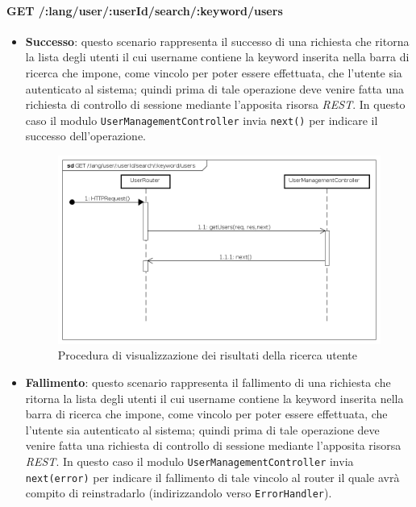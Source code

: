 \paragraph{GET /:lang/user/:userId/search/:keyword/users}
\begin{itemize}
\item \textbf{Successo}: questo scenario rappresenta il successo di una richiesta che ritorna la lista degli utenti il cui username contiene la keyword inserita nella barra di ricerca che impone, come vincolo per poter essere effettuata, che l'utente sia autenticato al sistema; quindi prima di tale operazione deve venire fatta una richiesta di controllo di sessione mediante l'apposita risorsa \textit{REST}. In questo caso il modulo \texttt{UserManagementController} invia \texttt{next()} per indicare il successo dell'operazione.

\begin{figure}[ht]
	\centering
	\includegraphics[scale=0.45]{UML/DiagrammiDiSequenza/Back-end/GET__lang_user__userId_search__keyword_users_success.png}
	\caption{Procedura di visualizzazione dei risultati della ricerca utente}
\end{figure}
\FloatBarrier

\item \textbf{Fallimento}: questo scenario rappresenta il fallimento di una richiesta che ritorna la lista degli utenti il cui username contiene la keyword inserita nella barra di ricerca che impone, come vincolo per poter essere effettuata, che l'utente sia autenticato al sistema; quindi prima di tale operazione deve venire fatta una richiesta di controllo di sessione mediante l'apposita risorsa \textit{REST}. In questo caso il modulo \texttt{UserManagementController} invia \texttt{next(error)} per indicare il fallimento di tale vincolo al router il quale avrà compito di reinstradarlo (indirizzandolo verso \texttt{ErrorHandler}).


\end{itemize}
